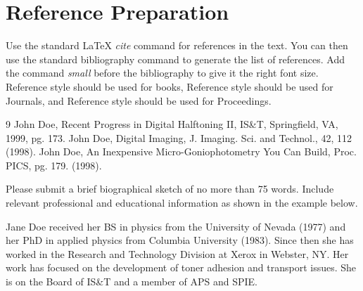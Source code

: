 \documentclass[letterpaper,twocolumn,fleqn]{article}
\begin{document}

\section{Reference Preparation}
Use the standard LaTeX \emph{cite} command for references in the
text. You can then use the standard bibliography command to generate
the list of references. Add the command \emph{small} before the
bibliography to give it the right font size.  Reference \cite{bib1}
style should be used for books, Reference \cite{bib2} style should be
used for Journals, and Reference \cite{bib3} style should be used for
Proceedings.




\small
\begin{thebibliography}{9}
John Doe, Recent Progress in Digital Halftoning II,
  IS\&T, Springfield, VA, 1999, pg. 173.
John Doe, Digital Imaging, J. Imaging. Sci. and
  Technol., 42, 112 (1998).
John Doe, An Inexpensive Micro-Goniophotometry You Can
  Build, Proc. PICS, pg. 179. (1998).
\end{thebibliography}


\begin{biography}
Please submit a brief biographical sketch of no more than 75 words. 
Include relevant professional and educational information as shown 
in the example below.

Jane Doe received her BS in physics from the University of Nevada (1977) 
and her PhD in applied physics from Columbia University (1983). Since 
then she has worked in the Research and Technology Division at Xerox 
in Webster, NY. Her work has focused on the development of toner adhesion 
and transport issues. She is on the Board of  IS\&T and a member of APS 
and SPIE.
\end{biography}
\end{document}
